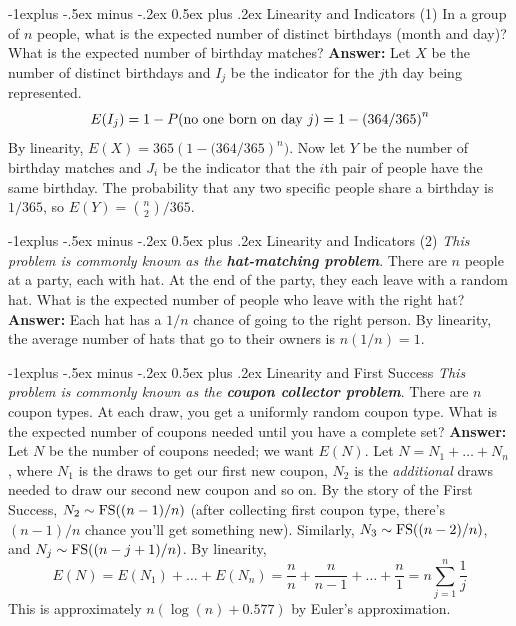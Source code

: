 \documentclass[10pt,landscape]{article}
\makeatletter
\renewcommand{\subsection}{\@startsection{subsection}{2}{0mm}%
{-1explus -.5ex minus -.2ex}%
{0.5ex plus .2ex}%
{\normalfont\normalsize\bfseries}}
\makeatother
\begin{document}
\begin{multicols*}{3}
        \subsection{Linearity and Indicators (1)} In a group of $n$ people, what is the expected number of distinct birthdays (month and day)? What is the expected number of birthday matches? \textbf{Answer:} Let $X$ be the number of distinct birthdays and $I_j$ be the indicator for the $j$th day being represented. \[E(I_j) = 1-P(\textnormal{no one born on day }j) = 1 - \left(364/365\right)^n\] By linearity, $\boxed{E(X) = 365\left(1-(364/365\right)^n)}$.
        Now let $Y$ be the number of birthday matches and $J_i$ be the indicator that the $i$th pair of people have the same birthday. The probability that any two specific people share a birthday is $1/365$, so $\boxed{E(Y) = \binom{n}{2} / 365}$.

        \subsection{Linearity and Indicators (2)}
        \emph{This problem is commonly known as the \textbf{hat-matching problem}}. There are $n$ people at a party, each with hat. At the end of the party, they each leave with a random hat. What is the expected number of people who leave with the right hat? \textbf{Answer:} Each hat has a $1/n$ chance of going to the right person. By linearity, the average number of hats that go to their owners is $\boxed{n(1/n) = 1}$.

        \subsection{Linearity and First Success}
        \emph{This problem is commonly known as the \textbf{coupon collector problem}}.
        There are $n$ coupon types. At each draw, you get a uniformly random coupon type. What is the expected number of coupons needed until you have a complete set? \textbf{Answer:} Let $N$ be the number of coupons needed; we want $E(N)$. Let $N = N_1 + \dots + N_n$, where $N_1$ is the draws to get our first new coupon, $N_2$ is the \emph{additional} draws needed to draw our second new coupon and so on. By the story of the First Success, $N_2 \sim \textnormal{FS}((n-1)/n)$ (after collecting first coupon type, there's $(n-1)/n$ chance you'll get something new). Similarly, $N_3 \sim \textnormal{FS}((n-2)/n)$, and $N_j \sim \textnormal{FS}((n-j+1)/n)$. By linearity,
        \[E(N) = E(N_1) + \dots + E(N_n) = \frac{n}{n} + \frac{n}{n-1} + \dots + \frac{n}{1} = \boxed{n\sum^n_{j=1} \frac{1}{j}}\]
        This is approximately $n (\log(n) + 0.577)$ by Euler's approximation.


\end{multicols*}
\end{document}
